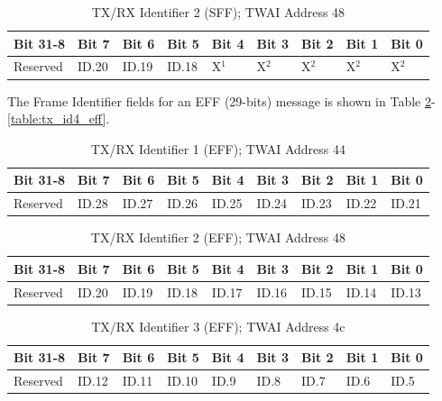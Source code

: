 \documentclass[main\_\_EN.tex]{subfiles}
\begin{document}
\begin{longtable}[c]{|p{1.4cm}|p{1.4cm}|p{1.4cm}|p{1.4cm}|p{1.4cm}|p{1.4cm}|p{1.4cm}|p{1.4cm}|p{1.4cm}|}
    \caption{TX/RX Identifier 2 (SFF); TWAI Address \hexprefix{}48}
    \label{table:tx_id2_sff}\\
    \hline
       \rowcolor{lightgray}
    Bit 31-8 & Bit 7 & Bit 6 & Bit 5 & Bit 4 & Bit 3 & Bit 2 & Bit 1 & Bit 0\\
    \hline
    Reserved & ID.20 & ID.19 & ID.18 & X$^1$ & X$^2$ & X$^2$ & X$^2$ & X$^2$\\
    \hline
\end{longtable}

The Frame Identifier fields for an EFF (29-bits) message is shown in Table \ref{table:tx_id1_eff}-\ref{table:tx_id4_eff}.

\begin{longtable}[c]{|p{1.4cm}|p{1.4cm}|p{1.4cm}|p{1.4cm}|p{1.4cm}|p{1.4cm}|p{1.4cm}|p{1.4cm}|p{1.4cm}|}
    \caption{TX/RX Identifier 1 (EFF); TWAI Address \hexprefix{}44}
    \label{table:tx_id1_eff}\\
    \hline
       \rowcolor{lightgray}
    Bit 31-8 & Bit 7 & Bit 6 & Bit 5 & Bit 4 & Bit 3 & Bit 2 & Bit 1 & Bit 0\\
    \hline
    Reserved & ID.28 & ID.27 & ID.26 & ID.25 & ID.24 & ID.23 & ID.22 & ID.21\\
    \hline
\end{longtable}

\begin{longtable}[c]{|p{1.4cm}|p{1.4cm}|p{1.4cm}|p{1.4cm}|p{1.4cm}|p{1.4cm}|p{1.4cm}|p{1.4cm}|p{1.4cm}|}
    \caption{TX/RX Identifier 2 (EFF); TWAI Address \hexprefix{}48}
    \label{table:tx_id2_eff}\\
    \hline
       \rowcolor{lightgray}
    Bit 31-8 & Bit 7 & Bit 6 & Bit 5 & Bit 4 & Bit 3 & Bit 2 & Bit 1 & Bit 0\\
    \hline
    Reserved & ID.20 & ID.19 & ID.18 & ID.17 & ID.16 & ID.15 & ID.14 & ID.13\\
    \hline
\end{longtable}

\begin{longtable}[c]{|p{1.4cm}|p{1.4cm}|p{1.4cm}|p{1.4cm}|p{1.4cm}|p{1.4cm}|p{1.4cm}|p{1.4cm}|p{1.4cm}|}
    \caption{TX/RX Identifier 3 (EFF); TWAI Address \hexprefix{}4c}
    \label{table:tx_id3_eff}\\
    \hline
       \rowcolor{lightgray}
    Bit 31-8 & Bit 7 & Bit 6 & Bit 5 & Bit 4 & Bit 3 & Bit 2 & Bit 1 & Bit 0\\
    \hline
    Reserved & ID.12 & ID.11 & ID.10 & ID.9 & ID.8 & ID.7 & ID.6 & ID.5\\
    \hline
\end{longtable}
\end{document}
